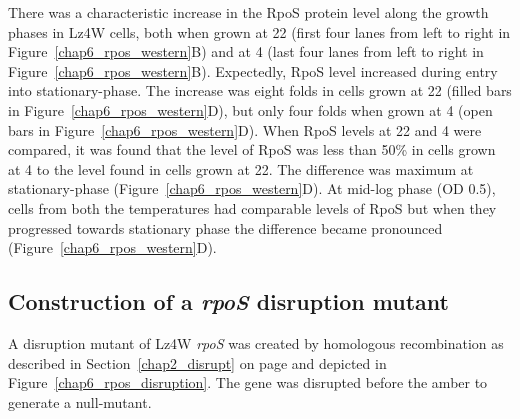 There was a characteristic increase in the RpoS protein level
along the grow\-th phases in Lz4W cells, both when grown at
22\dg{} (first four lanes from left to right in
Figure~\ref{chap6_rpos_western}B) and at 4\dg{} (last four lanes
from left to right in Figure~\ref{chap6_rpos_western}B).
Expectedly, RpoS level increased during entry into
stationary-phase. The increase was eight folds in cells grown at
22\dg{} (filled bars in Figure~\ref{chap6_rpos_western}D), but
only four folds when grown at 4\dg{} (open bars in
Figure~\ref{chap6_rpos_western}D). When RpoS levels at 22\dg{} and
4\dg{} were compared, it was found that the level of RpoS was less
than 50\% in cells grown at 4\dg{} to the level found in cells
grown at 22\dg{}\@. The difference was maximum at stationary-phase
(Figure~\ref{chap6_rpos_western}D). At mid-log phase (OD
0.5), cells from both the temperatures had comparable levels of
RpoS but when they progressed towards stationary phase the
difference became pronounced (Figure~\ref{chap6_rpos_western}D).


\subsection{Construction of a \emph{rpoS} disruption mutant}

A disruption mutant of Lz4W \emph{rpoS} was created by homologous
recombination as described in Section~\ref{chap2_disrupt} on page
\pageref{chap2_disrupt} and depicted in
Figure~\ref{chap6_rpos_disruption}. The gene was disrupted before
the amber to generate a null-mutant.



